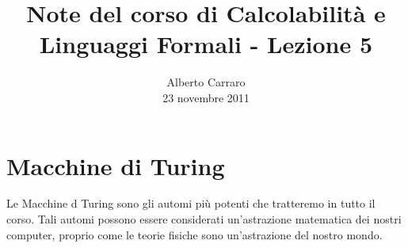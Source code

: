 \documentclass[runningheads,a4paper]{llncs}
\begin{document}
\mainmatter  %

\title{Note del corso di Calcolabilit\`{a} e Linguaggi Formali - Lezione 5}


%
%
\author{Alberto Carraro \\ 23 novembre 2011}
%


%
%




\maketitle

\section{Macchine di Turing}

Le Macchine d Turing sono gli automi pi\`{u} potenti che tratteremo in tutto il corso. Tali automi possono essere considerati un'astrazione matematica dei nostri computer, proprio come le teorie fisiche sono un'astrazione del nostro mondo.
\end{document}
